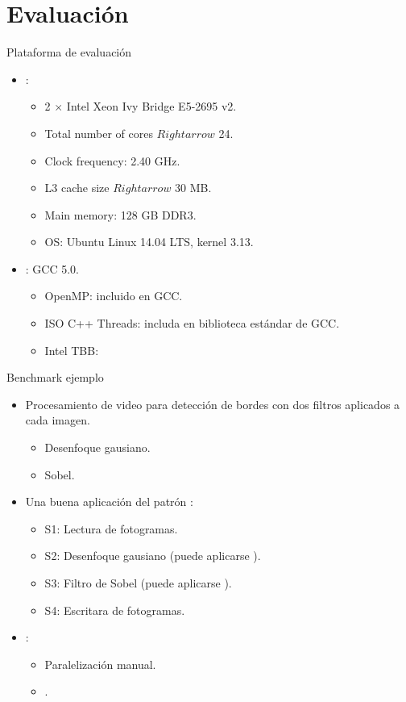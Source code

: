 \section{Evaluación}

\begin{frame}[t]{Plataforma de evaluación}
\begin{itemize}
  \item {}:
    \begin{itemize}
      \item 2 $\times$ Intel Xeon Ivy Bridge E5-2695 v2.
      \item Total number of cores $Rightarrow$ 24.
      \item Clock frequency: 2.40 GHz.
      \item L3 cache size $Rightarrow$ 30 MB.
      \item Main memory: 128 GB DDR3.
      \item OS: Ubuntu Linux 14.04 LTS, kernel 3.13.
    \end{itemize}

  \vfill
  \item {}: GCC 5.0.
    \begin{itemize}
      \item OpenMP: incluido en GCC.
      \item ISO C++ Threads: includa en biblioteca estándar de GCC.
      \item Intel TBB: 
    \end{itemize}
\end{itemize}
\end{frame}

\begin{frame}[t]{Benchmark ejemplo}
\begin{itemize}
  \item Procesamiento de video para detección de bordes con dos filtros aplicados a cada imagen.
    \begin{itemize}
      \item Desenfoque gausiano.
      \item Sobel.
    \end{itemize}
  \vfill\pause
  \item Una buena aplicación del patrón :
    \begin{itemize}
      \item S1: Lectura de fotogramas.
      \item S2: Desenfoque gausiano (puede aplicarse ).
      \item S3: Filtro de Sobel (puede aplicarse ).
      \item S4: Escritara de fotogramas.
    \end{itemize}
  \vfill\pause
  \item {}:
    \begin{itemize}
      \item Paralelización manual.
      \item {}.
    \end{itemize}
\end{itemize}
\end{frame}

